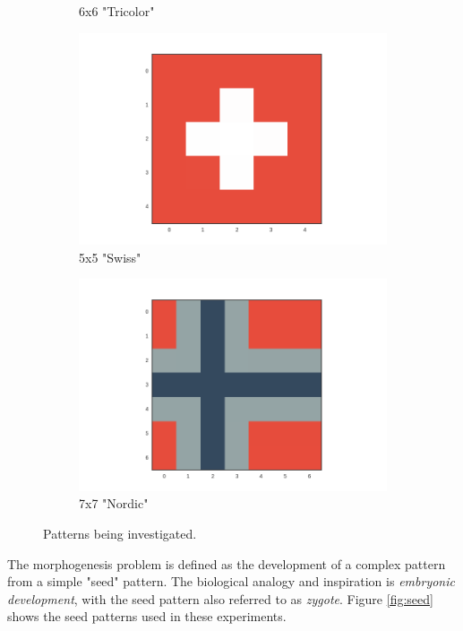 \begin{figure}[h]
\begin{subfigure}[b]{.20\textwidth}
\caption{6x6 "Tricolor"}
\end{subfigure}%
\begin{subfigure}[b]{.20\textwidth}
\centering
\includegraphics[width=\textwidth]{fig/swiss}
\caption{5x5 "Swiss"}
\end{subfigure}%
\begin{subfigure}[b]{.20\textwidth}
\centering
\includegraphics[width=\textwidth]{fig/nordic}
\caption{7x7 "Nordic"}
\end{subfigure}%

\caption{Patterns being investigated.}
\label{fig:patterns}
\end{figure}

The morphogenesis problem is defined as the development of a complex pattern from a simple "seed" pattern.
The biological analogy and inspiration is \textit{embryonic development},
with the seed pattern also referred to as \textit{zygote}.
Figure \ref{fig:seed} shows the seed patterns used in these experiments.

